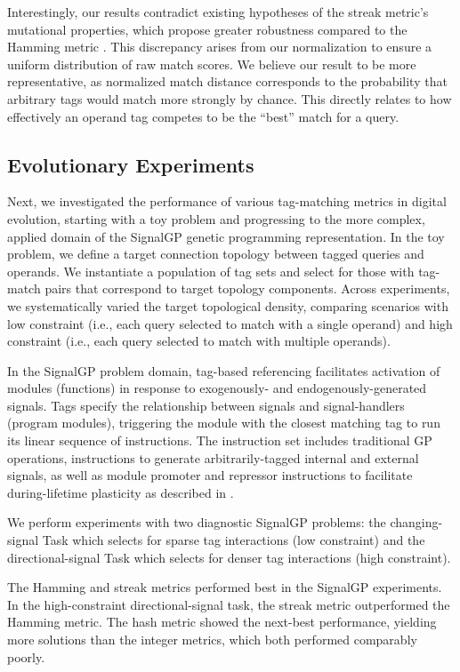 Interestingly, our results contradict existing hypotheses of the streak metric's mutational properties, which propose greater robustness compared to the Hamming metric \citep{downing2015intelligence}.
This discrepancy arises from our normalization to ensure a uniform distribution of raw match scores.
We believe our result to be more representative, as normalized match distance corresponds to the probability that arbitrary tags would match more strongly by chance.
This directly relates to how effectively an operand tag competes to be the ``best'' match for a query.

\subsection{Evolutionary Experiments}

Next, we investigated the performance of various tag-matching metrics in digital evolution, starting with a toy problem and progressing to the more complex, applied domain of the SignalGP genetic programming representation.
In the toy problem, we define a target connection topology between tagged queries and operands.
We instantiate a population of tag sets and select for those with tag-match pairs that correspond to target topology components.
Across experiments, we systematically varied the target topological density, comparing scenarios with low constraint (i.e., each query selected to match with a single operand) and high constraint (i.e., each query selected to match with multiple operands).

In the SignalGP problem domain, tag-based referencing facilitates activation of modules (functions) in response to exogenously- and endogenously-generated signals.
Tags specify the relationship between signals and signal-handlers (program modules), triggering the module with the closest matching tag to run its linear sequence of instructions.
The instruction set includes traditional GP operations, instructions to generate arbitrarily-tagged internal and external signals, as well as module promoter and repressor instructions to facilitate during-lifetime plasticity as described in \cite{lalejini2021tag}.

We perform experiments with two diagnostic SignalGP problems: the changing-signal Task which selects for sparse tag interactions (low constraint) and the directional-signal Task which selects for denser tag interactions (high constraint).

The Hamming and streak metrics performed best in the SignalGP experiments.
In the high-constraint directional-signal task, the streak metric outperformed the Hamming metric.
The hash metric showed the next-best performance, yielding more solutions than the integer metrics, which both performed comparably poorly.

